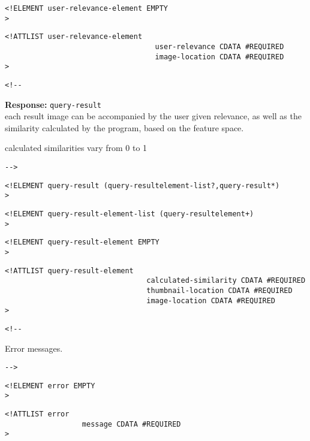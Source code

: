 \documentclass{article}
\newcommand{\responsetitle}[1]{\textbf{Response: }{\texttt{#1}}\\}
\begin{document}
\begin{verbatim}
<!ELEMENT user-relevance-element EMPTY 
>\end{verbatim}

\begin{verbatim}
<!ATTLIST user-relevance-element 
                                   user-relevance CDATA #REQUIRED
                                   image-location CDATA #REQUIRED
>\end{verbatim}

\begin{verbatim}<!--\end{verbatim}
  

     \responsetitle{query-result}

     each result image can be accompanied by the user given relevance,
     as well as the similarity calculated by the program, based on the
     feature space.

     calculated similarities vary from 0 to 1

       
 \begin{verbatim}-->\end{verbatim}



\begin{verbatim}
<!ELEMENT query-result (query-resultelement-list?,query-result*) 
>\end{verbatim}

\begin{verbatim}
<!ELEMENT query-result-element-list (query-resultelement+) 
>\end{verbatim}

\begin{verbatim}
<!ELEMENT query-result-element EMPTY 
>\end{verbatim}

\begin{verbatim}
<!ATTLIST query-result-element 
                                 calculated-similarity CDATA #REQUIRED
                                 thumbnail-location CDATA #REQUIRED
                                 image-location CDATA #REQUIRED
>\end{verbatim}

\begin{verbatim}<!--\end{verbatim}
  

     Error messages.

       
 \begin{verbatim}-->\end{verbatim}



\begin{verbatim}
<!ELEMENT error EMPTY 
>\end{verbatim}

\begin{verbatim}
<!ATTLIST error 
                  message CDATA #REQUIRED
>\end{verbatim}
\end{document}
